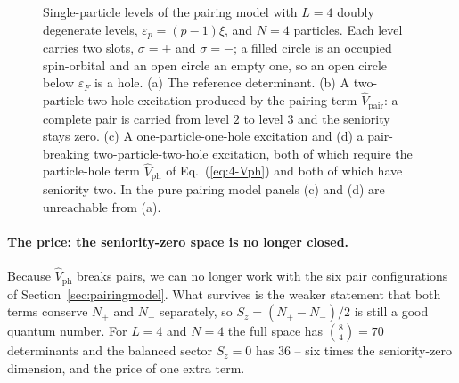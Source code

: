 \begin{figure}[htbp]
\centering
{}
\caption{Single-particle levels of the pairing model with $L=4$ doubly
degenerate levels, $\varepsilon_p=(p-1)\xi$, and $N=4$ particles.  Each level
carries two slots, $\sigma=+$ and $\sigma=-$; a filled circle is an occupied
spin-orbital and an open circle an empty one, so an open circle below
$\varepsilon_F$ is a hole.  (a) The reference determinant.  (b) A
two-particle-two-hole excitation produced by the pairing term
$\hat{V}_{\mathrm{pair}}$: a complete pair is carried from level $2$ to level
$3$ and the seniority stays zero.  (c) A one-particle-one-hole excitation and
(d) a pair-breaking two-particle-two-hole excitation, both of which require
the particle-hole term $\hat{V}_{\mathrm{ph}}$ of Eq.~(\ref{eq:4-Vph}) and
both of which have seniority two.  In the pure pairing model panels (c) and
(d) are unreachable from (a).}
\label{fig:4-levels}
\end{figure}

\paragraph{The price: the seniority-zero space is no longer closed.}
Because $\hat{V}_{\mathrm{ph}}$ breaks pairs, we can no longer work with the
six pair configurations of Section~\ref{sec:pairingmodel}.  What survives is
the weaker statement that both terms conserve $N_+$ and $N_-$ separately, so
$S_z=(N_+-N_-)/2$ is still a good quantum number.  For $L=4$ and $N=4$ the
full space has $\binom{8}{4}=70$ determinants and the balanced sector
$S_z=0$ has $36$ -- six times the seniority-zero dimension, and the price of
one extra term.

